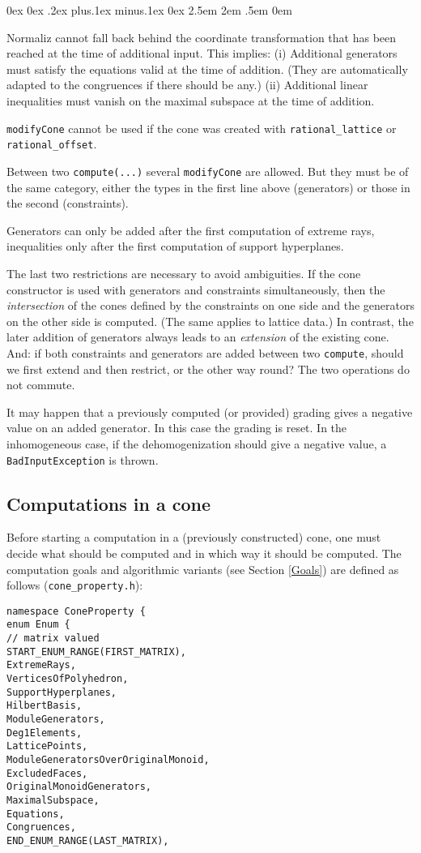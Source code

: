 \documentclass[12pt,a4paper]{scrartcl}
\newcounter{listi}
\newcommand{\stdli}{ \topsep0ex \partopsep0ex %
\parsep.2ex plus.1ex minus.1ex \itemsep0ex%
\leftmargin2.5em \labelwidth2em \labelsep.5em \rightmargin0em}%
\newenvironment{arab}{\begin{list}{\textup{(\arabic{listi})}}%
	{\usecounter{listi}\stdli}}{\end{list}}
\theoremstyle{definition}
\begin{document}
\begin{small}
\begin{arab}
\item Normaliz cannot fall back behind the coordinate transformation that has been reached at the time of additional input. This implies: (i) Additional generators must satisfy the equations valid at the time of addition. (They are automatically adapted to the congruences if there should be any.) (ii) Additional linear inequalities must vanish on the maximal subspace at the time of addition.

\item \verb|modifyCone| cannot be used if the cone was created with \verb|rational_lattice| or \verb|rational_offset|.

\item Between two \verb|compute(...)| several \verb|modifyCone| are allowed. But they must be of the same category, either the types in the first line above (generators) or those in the second (constraints).

\item Generators can only be added after the first computation of extreme rays, inequalities only after the first computation of support hyperplanes.

\end{arab}

The last two restrictions are necessary to avoid ambiguities. If the cone constructor is used with generators and constraints simultaneously, then the \emph{intersection} of the cones defined by the constraints on one side and the generators on the other side is computed. (The same applies to lattice data.) In contrast, the later addition of generators always leads to an \emph{extension} of the existing cone. And: if both constraints and generators are added between two \verb|compute|, should we first extend and then restrict, or the other way round? The two operations do not commute.

It may happen that a previously computed (or provided) grading gives a negative value on an added generator. In this case the grading is reset. In the inhomogeneous case, if the dehomogenization should give a negative value, a \verb|BadInputException| is thrown.

\subsection{Computations in a cone}

Before starting a computation in a (previously constructed) cone, one must decide what should be computed and in which way it should be computed. The computation goals and algorithmic variants (see Section \ref{Goals}) are defined as follows (\verb|cone_property.h|):
\begin{Verbatim}
namespace ConeProperty {
enum Enum {
// matrix valued
START_ENUM_RANGE(FIRST_MATRIX),
ExtremeRays,
VerticesOfPolyhedron,
SupportHyperplanes,
HilbertBasis,
ModuleGenerators,
Deg1Elements,
LatticePoints,
ModuleGeneratorsOverOriginalMonoid,
ExcludedFaces,
OriginalMonoidGenerators,
MaximalSubspace,
Equations,
Congruences,
END_ENUM_RANGE(LAST_MATRIX),


\end{Verbatim}
\end{small}
\end{document}
